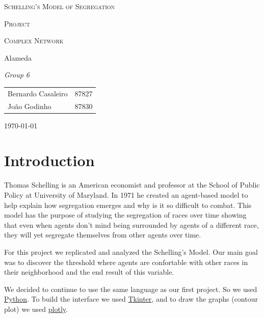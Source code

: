 \documentclass[a4paper,titlepage,11pt]{article}
\begin{document}
\begin{titlepage}
  \begin{center}
    {\scshape \huge Schelling's Model of Segregation \par}
    \vspace{1cm}

    {\scshape \LARGE Project \par}
    \vspace{1.5cm}

    {\scshape \Large Complex Network \par}
    \vspace{0.5cm}

    {\Large Alameda \par}
    \vfill

    {\itshape \Large Group 6 \par}
    \vfill

    \begin{tabular}{l l}
      Bernardo Casaleiro & 87827\\
      João Godinho & 87830\\
    \end{tabular}
    \vfill

    {\large \today\par}
  \end{center}
\end{titlepage}

\section{Introduction}
Thomas Schelling is an American economist and professor at the School of Public Policy at University of Maryland.
In 1971 he created an agent-based model to help explain how segregation emerges and why is it so difficult to combat.
This model has the purpose of studying the segregation of races over time showing that even when agents don't mind
being surrounded by agents of a different race, they will yet segregate themselves from other agents over time.

For this project we replicated and analyzed the Schelling's Model. Our main goal was to discover the threshold
where agents are confortable with other races in their neighborhood and the end result of this variable.

We decided to continue to use the same language as our first project. So we used \href{https://www.python.org}{Python}.
To build the interface we used \href{https://wiki.python.org/moin/TkInter}{Tkinter},
and to draw the graphs (contour plot) we used \href{https://plot.ly/}{plotly}.
\end{document}
